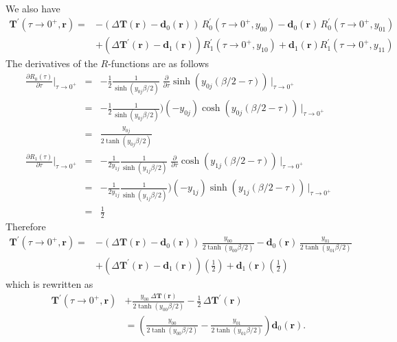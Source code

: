 We also have
\begin{equation}
\begin{split}
\mathbf{T}^{\prime}(\tau \to 0^+, \mathbf{r}) = &
 -(\Delta \mathbf{T}(\mathbf{r})
- \mathbf{d}_0(\mathbf{r}))\,R_0^{\prime}(\tau \to 0^+, y_{00}) -
 \mathbf{d}_0(\mathbf{r}) \,R_0^{\prime}(\tau \to 0^+, y_{01}) \\
& + (\Delta \mathbf{T}^{\prime}(\mathbf{r}) - \mathbf{d}_1(\mathbf{r}))
R_1^{\prime}(\tau \to 0^+, y_{10}) + \mathbf{d}_1(\mathbf{r}) 
R_1^{\prime}(\tau \to 0^+, y_{11})
\end{split}
\end{equation}
The derivatives of the $R$-functions are as follows
\begin{eqnarray}
\frac{\partial R_0(\tau)}{\partial \tau}\bigg\vert_{\tau \to 0^+} & = &
-\frac{1}{2}\frac{1}{\sinh(y_{0j} \beta/2)} \;
\frac{\partial}{\partial \tau}
\sinh(y_{0j}(\beta/2 - \tau))\, \bigg\vert_{\tau \to 0^+} \\
& = & -\frac{1}{2}\frac{1}{\sinh(y_{0j} \beta/2)} )(-y_{0j})
\cosh(y_{0j}(\beta/2 - \tau))\, \bigg\vert_{\tau \to 0^+} \\
& = & \frac{y_{0j}}{2 \tanh(y_{0j} \beta /2)} \\
\frac{\partial R_1(\tau)}{\partial \tau}\bigg\vert_{\tau \to 0^+} & = &
-\frac{1}{2 y_{1j}}\frac{1}{\sinh(y_{1j} \beta/2)} \;
\frac{\partial}{\partial \tau}
\cosh(y_{1j}(\beta/2 - \tau))\, \bigg\vert_{\tau \to 0^+} \\
& = & -\frac{1}{2 y_{1j}}\frac{1}{\sinh(y_{1j} \beta/2)} )(-y_{1j})
\sinh(y_{1j}(\beta/2 - \tau))\, \bigg\vert_{\tau \to 0^+} \\
& = & \frac{1}{2}
\end{eqnarray}
Therefore
\begin{equation}
\begin{split}
\mathbf{T}^{\prime}(\tau \to 0^+, \mathbf{r}) = &
 -(\Delta \mathbf{T}(\mathbf{r})
- \mathbf{d}_0(\mathbf{r}))\,\frac{y_{00}}{2 \tanh(y_{00} \beta/2)} -
 \mathbf{d}_0(\mathbf{r}) \,\frac{y_{01}}{2 \tanh(y_{01} \beta/2)} \\
& + (\Delta \mathbf{T}^{\prime}(\mathbf{r}) - \mathbf{d}_1(\mathbf{r}))
\left( \frac{1}{2} \right) + \mathbf{d}_1(\mathbf{r}) 
\left( \frac{1}{2} \right)
\end{split}
\end{equation}
which is rewritten as
\begin{equation}
\begin{split}
\mathbf{T}^{\prime}(\tau \to 0^+, \mathbf{r}) & + 
\frac{
y_{00}\;\Delta \mathbf{T}(\mathbf{r})}
{2 \tanh(y_{00} \beta /2)}
-
\frac{1}{2}\,\Delta \mathbf{T}^{\prime}(\mathbf{r}) \\
 & = \left( \frac{y_{00}}{2\tanh(y_{00}\beta /2)}
 - \frac{y_{01}}{2 \tanh(y_{01}\beta /2)} \right) \mathbf{d}_0(\mathbf{r}).
\end{split}
\end{equation}
